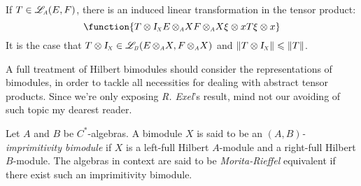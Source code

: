 If $T\in \sub\adj{A}(E,F)$, there is an induced linear transformation in the tensor product:
\begin{equation*}
	\function{{T\otimes \sub\Id X}{E\,\sub\otimes A X}{F\,\sub\otimes A X}{\xi\otimes x}{T\xi\otimes x}}
\end{equation*}
It is the case that $T\otimes \sub\Id X \in \sub\adj{B}(E\,\sub\otimes A X, F\,\sub\otimes A X)$ and $\|T\otimes \sub\Id X\| \leqslant \|T\|$.

A full treatment of Hilbert bimodules should consider the representations of bimodules, in order to tackle all necessities for dealing with abstract tensor products. Since we're only exposing \textit{R. Exel}'s result, mind not our avoiding of such topic my dearest reader.

\begin{definicao}
	Let $A$ and $B$ be $C^*$-algebras. A bimodule $X$ is said to be an \textit{$(A,B)$-imprimitivity bimodule} if $X$ is a left-full Hilbert $A$-module and a right-full Hilbert $B$-module. The algebras in context are said to be \textit{Morita-Rieffel} equivalent if there exist such an imprimitivity bimodule.
\end{definicao}

